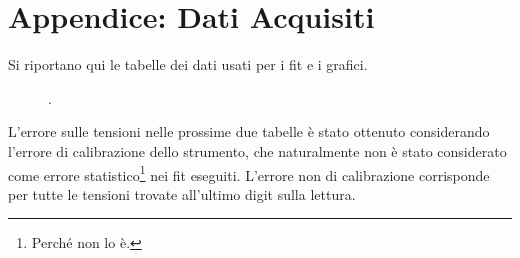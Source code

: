 \documentclass[a4paper,10pt]{article}
\begin{document}
\pagebreak

\section{Appendice: Dati Acquisiti}
Si riportano qui le tabelle dei dati usati per i fit e i grafici.

\begin{table}[H]
	\centering
	
	\caption{.}
	\label{tab:prepreamp}
\end{table}

\begin{table}[H]
	\centering
	
	\caption{.}
	\label{tab:postpreamp}
\end{table}

\begin{figure}
	\begin{minipage}{0.64\textwidth}
		\begin{table}[H]
			\centering
			
			\caption{.}
			\label{tab:bandpass}
		\end{table}
	\end{minipage}
	\begin{minipage}{0.34\textwidth}
		\begin{table}[H]
			\centering
			
			\caption{.}
			\label{tab:RMScal}
		\end{table}
	\end{minipage}
\end{figure}

\begin{table}[H]
	\centering
	
	\caption{Valori delle frequenze utilizzate e del potenziale in uscita al circuito utilizzando un partitore 1000:1.}
	\label{tab:totamp}
\end{table}

\pagebreak

L'errore sulle tensioni nelle prossime due tabelle è stato ottenuto considerando l'errore di calibrazione dello strumento, che naturalmente non è stato considerato come errore statistico\footnote{Perché non lo è.} nei fit eseguiti.
L'errore non di calibrazione corrisponde per tutte le tensioni trovate all'ultimo digit sulla lettura.

\begin{table}[H]
	\centering
	
	\caption{.}
	\label{tab:lastfit}
\end{table}

\begin{table}[H]
	\centering
	
	\caption{.}
	\label{tab:lastfit1}
\end{table}
\end{document}
